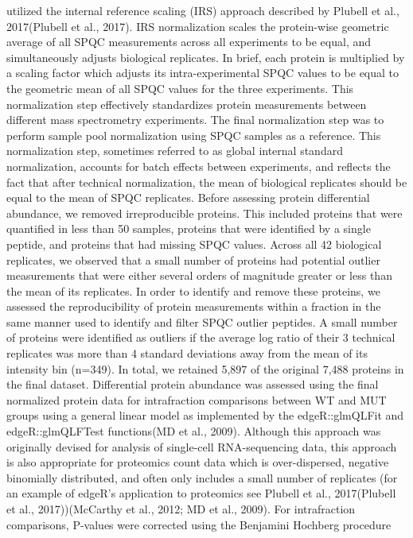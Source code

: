 utilized the internal reference scaling (IRS) approach described by Plubell et
al., 2017(Plubell et al., 2017). IRS normalization scales the protein-wise
geometric average of all SPQC measurements across all experiments to be equal,
and simultaneously adjusts biological replicates. In brief, each protein is
multiplied by a scaling factor which adjusts its intra-experimental SPQC values
to be equal to the geometric mean of all SPQC values for the three experiments.
This normalization step effectively standardizes protein measurements between
different mass spectrometry experiments. 
The final normalization step was to perform sample pool normalization using SPQC
samples as a reference. This normalization step, sometimes referred to as global
internal standard normalization, accounts for batch effects between experiments,
and reflects the fact that after technical normalization, the mean of biological
replicates should be equal to the mean of SPQC replicates.
Before assessing protein differential abundance, we removed irreproducible
proteins. This included proteins that were quantified in less than 50%
samples, proteins that were identified by a single peptide, and proteins that
had missing SPQC values. Across all 42 biological replicates, we observed that a
small number of proteins had potential outlier measurements that were either
several orders of magnitude greater or less than the mean of its replicates. In
order to identify and remove these proteins, we assessed the reproducibility of
protein measurements within a fraction in the same manner used to identify and
filter SPQC outlier peptides. A small number of proteins were identified as
outliers if the average log ratio of their 3 technical replicates was more than
4 standard deviations away from the mean of its intensity bin (n=349). In total,
we retained 5,897 of the original 7,488 proteins in the final dataset. 
Differential protein abundance was assessed using the final normalized protein
data for intrafraction comparisons between WT and MUT groups using a general
linear model as implemented by the edgeR::glmQLFit and edgeR::glmQLFTest
functions(MD et al., 2009). Although this approach was originally devised for
analysis of single-cell RNA-sequencing data, this approach is also appropriate
for proteomics count data which is over-dispersed, negative binomially
distributed, and often only includes a small number of replicates (for an
example of edgeR’s application to proteomics see Plubell et al., 2017(Plubell et
al., 2017))(McCarthy et al., 2012; MD et al., 2009). For intrafraction
comparisons, P-values were corrected using the Benjamini Hochberg procedure
